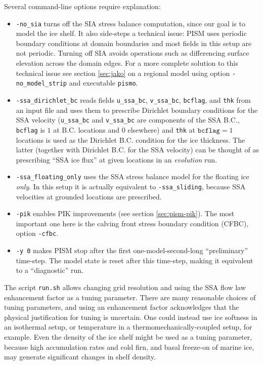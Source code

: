 \noindent Several command-line options require explanation:
\begin{itemize}
\item \texttt{-no_sia} turns off the SIA stress balance computation, since our
  goal is to model the ice shelf. It also side-steps a technical issue: PISM
  uses periodic boundary conditions at domain boundaries and most fields in
  this setup are not periodic. Turning off SIA avoids operations such as
  differencing surface elevation across the domain edges.  For a more complete
  solution to this technical issue see section \ref{sec:jako} on a regional model using
  option \verb|-no_model_strip| and executable \verb|pismo|.
\item \texttt{-ssa_dirichlet_bc} reads fields \texttt{u_ssa_bc}, \texttt{v_ssa_bc}, \texttt{bcflag}, and \texttt{thk} from an input file and uses them to prescribe Dirichlet boundary conditions for the SSA velocity (\texttt{u_ssa_bc} and \texttt{v_ssa_bc} are components of the SSA B.C., \texttt{bcflag} is $1$ at B.C. locations and $0$ elsewhere) and \texttt{thk} at $\mathtt{bcflag} = 1$ locations is used as the Dirichlet B.C. condition for the ice thickness. The latter (together with Dirichlet B.C. for the SSA velocity) can be thought of as prescribing ``SSA ice flux'' at given locations in an \emph{evolution} run.
\item \texttt{-ssa_floating_only} uses the SSA stress balance model for the floating ice \emph{only}. In this setup it is actually equivalent to \texttt{-ssa_sliding}, because SSA velocities at grounded locations are prescribed.
\item \texttt{-pik} enables PIK improvements (see section \ref{sec:pism-pik}). The most important one here is the calving front stress boundary condition (CFBC), option \verb|-cfbc|.
\item \texttt{-y 0} makes PISM stop after the first one-model-second-long ``preliminary'' time-step.  The model state is reset after this time-step, making it equivalent to a ``diagnostic'' run.
\end{itemize}

The script \texttt{run.sh} allows changing grid resolution and using the SSA flow law enhancement factor as a tuning parameter.  There are many reasonable choices of tuning parameters, and using an enhancement factor acknowledges that the physical justification for tuning is uncertain.  One could instead use ice softness in an isothermal setup, or temperature in a thermomechanically-coupled setup, for example.  Even the density of the ice shelf might be used as a tuning parameter, because high accumulation rates and cold firn, and basal freeze-on of marine ice, may generate significant changes in shelf density.

